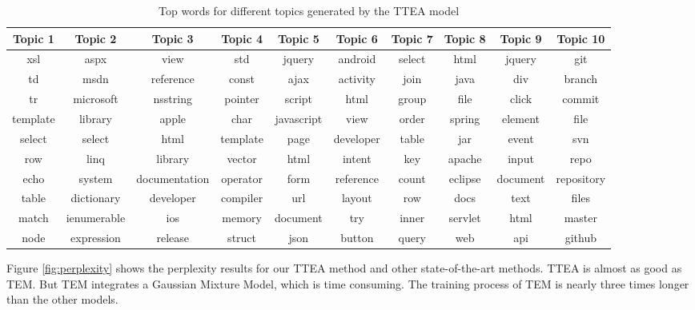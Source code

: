 {{{{{{{\begin{sidewaystable}
\caption{Top words for different topics generated by the TTEA model}
\label{tab:topwordsp}
\centering
\begin{tabular}{cccccccccc}
\hline
Topic 1& Topic 2& Topic 3& Topic 4 & Topic 5 & Topic 6& Topic 7 & Topic 8 &Topic 9 & Topic 10\\
\hline
xsl&aspx&view&std&jquery&android&select&html&jquery&git \\ 
td&msdn&reference&const&ajax&activity&join&java&div&branch \\ 
tr&microsoft&nsstring&pointer&script&html&group&file&click&commit \\ 
template&library&apple&char&javascript&view&order&spring&element&file \\ 
select&select&html&template&page&developer&table&jar&event&svn \\ 
row&linq&library&vector&html&intent&key&apache&input&repo \\ 
echo&system&documentation&operator&form&reference&count&eclipse&document&repository \\ 
table&dictionary&developer&compiler&url&layout&row&docs&text&files \\ 
match&ienumerable&ios&memory&document&try&inner&servlet&html&master \\ 
node&expression&release&struct&json&button&query&web&api&github \\ 
\hline
\end{tabular}
\end{sidewaystable}

Figure \ref{fig:perplexity} shows the perplexity results for our TTEA method and other state-of-the-art methods. %
TTEA is almost as good as TEM. But TEM integrates a Gaussian Mixture Model, which is time consuming. The training process of TEM is nearly three times longer than the other models.





}}}}}}}
